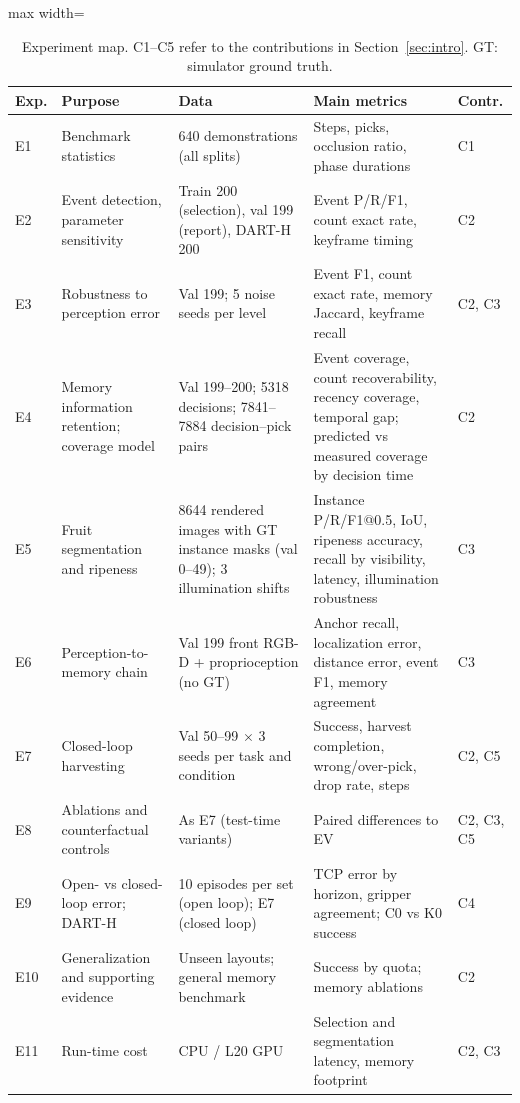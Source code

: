\begin{table}[t]
\centering
\caption{Experiment map. C1--C5 refer to the contributions in Section~\ref{sec:intro}. GT: simulator ground truth.}
\label{tab:rq}
\footnotesize
\begin{adjustbox}{max width=\textwidth}\begin{tabular}{p{0.7cm}p{2.8cm}p{3.2cm}p{3.6cm}p{0.9cm}}
\toprule
Exp. & Purpose & Data & Main metrics & Contr.\\
\midrule
E1 & Benchmark statistics & 640 demonstrations (all splits) & Steps, picks, occlusion ratio, phase durations & C1\\
E2 & Event detection, parameter sensitivity & Train 200 (selection), val 199 (report), DART-H 200 & Event P/R/F1, count exact rate, keyframe timing & C2\\
E3 & Robustness to perception error & Val 199; 5 noise seeds per level & Event F1, count exact rate, memory Jaccard, keyframe recall & C2, C3\\
E4 & Memory information retention; coverage model & Val 199--200; 5318 decisions; 7841--7884 decision--pick pairs & Event coverage, count recoverability, recency coverage, temporal gap; predicted vs measured coverage by decision time & C2\\
E5 & Fruit segmentation and ripeness & 8644 rendered images with GT instance masks (val 0--49); 3 illumination shifts & Instance P/R/F1@0.5, IoU, ripeness accuracy, recall by visibility, latency, illumination robustness & C3\\
E6 & Perception-to-memory chain & Val 199 front RGB-D + proprioception (no GT) & Anchor recall, localization error, distance error, event F1, memory agreement & C3\\
E7 & Closed-loop harvesting & Val 50--99 $\times$ 3 seeds per task and condition & Success, harvest completion, wrong/over-pick, drop rate, steps & C2, C5\\
E8 & Ablations and counterfactual controls & As E7 (test-time variants) & Paired differences to EV & C2, C3, C5\\
E9 & Open- vs closed-loop error; DART-H & 10 episodes per set (open loop); E7 (closed loop) & TCP error by horizon, gripper agreement; C0 vs K0 success & C4\\
E10 & Generalization and supporting evidence & Unseen layouts; general memory benchmark & Success by quota; memory ablations & C2\\
E11 & Run-time cost & CPU / L20 GPU & Selection and segmentation latency, memory footprint & C2, C3\\
\bottomrule
\end{tabular}\end{adjustbox}
\end{table}

